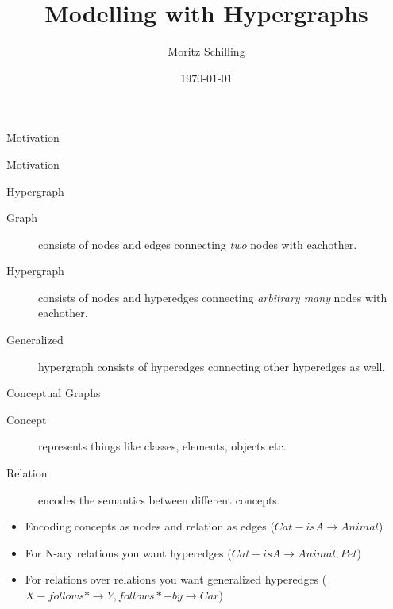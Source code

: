 \documentclass[pdf]
{beamer}
\title[ESTEC June 2017]
{
    \textbf{Modelling with Hypergraphs}
}
\author{Moritz Schilling}
\date{\today}
\begin{document}
\begin{frame}[plain]
    \titlepage
\end{frame}


\begin{frame}{Motivation}
	\centering
	
\end{frame}

\begin{frame}{Motivation}
	\centering
	
\end{frame}


\begin{frame}{Hypergraph}
    \begin{description}
        \item[Graph] consists of nodes and edges connecting \emph{two} nodes with eachother.
        \item[Hypergraph] consists of nodes and hyperedges connecting \emph{arbitrary many} nodes with eachother.
        \item[Generalized] hypergraph consists of hyperedges connecting other hyperedges as well.
    \end{description}
\end{frame}

\begin{frame}{Conceptual Graphs}
    \begin{description}
        \item[Concept] represents things like classes, elements, objects etc.
        \item[Relation] encodes the semantics between different concepts.
    \end{description}
    \begin{itemize}
        \item Encoding concepts as nodes and relation as edges ($Cat - isA \to Animal$)
        \item For N-ary relations you want hyperedges ($Cat - isA \to Animal, Pet$)
        \item For relations over relations you want generalized hyperedges ($X - follows* \to Y, follows* - by \to Car$) 
    \end{itemize}
\end{frame}
\end{document}
